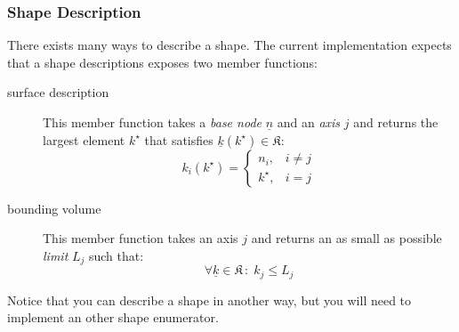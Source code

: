 \documentclass{article}
\begin{document}
\subsubsection{Shape Description}
There exists many ways to describe a shape.
The current implementation expects that a shape descriptions exposes two member functions:
\begin{description}
\item [surface description] This member function takes a \emph{base node} \( \underline{n} \) and an \emph{axis} \(j\) and returns the largest element \( k^\star \) that satisfies \( \underline{k}(k^\star) \in \mathfrak{K} \): 
\[ k_i(k^\star) =
\begin{cases}
	n_i,& i \neq j\\
	k^\star, & i = j
	\end{cases}
\]
\item [bounding volume] This member function takes an axis \(j\) and returns an as small as possible \emph{limit} \( L_j \) such that:
\[ \forall \underline{k} \in \mathfrak{K} \,\colon\; k_j \leq L_j \]
\end{description}


Notice that you can describe a shape in another way, but you will need to implement an other shape enumerator.
\end{document}
